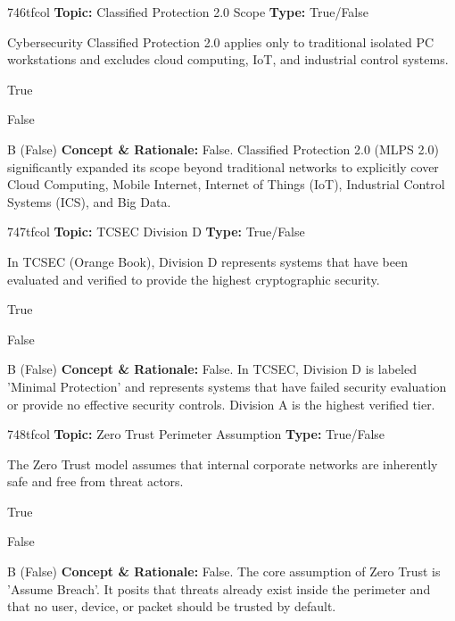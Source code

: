 \begin{qcard}{746}{tfcol}
\textcolor{darkslate!75}{\small\textbf{Topic:} Classified Protection 2.0 Scope \hfill \textbf{Type:} True/False}\vspace{0.4em}\par
Cybersecurity Classified Protection 2.0 applies only to traditional isolated PC workstations and excludes cloud computing, IoT, and industrial control systems.
\begin{qoptions}
\item True
\item False
\end{qoptions}
\end{qcard}
\nopagebreak
\begin{explainbox}{B (False)}
\textbf{Concept \& Rationale:} False. Classified Protection 2.0 (MLPS 2.0) significantly expanded its scope beyond traditional networks to explicitly cover Cloud Computing, Mobile Internet, Internet of Things (IoT), Industrial Control Systems (ICS), and Big Data.
\end{explainbox}

\begin{qcard}{747}{tfcol}
\textcolor{darkslate!75}{\small\textbf{Topic:} TCSEC Division D \hfill \textbf{Type:} True/False}\vspace{0.4em}\par
In TCSEC (Orange Book), Division D represents systems that have been evaluated and verified to provide the highest cryptographic security.
\begin{qoptions}
\item True
\item False
\end{qoptions}
\end{qcard}
\nopagebreak
\begin{explainbox}{B (False)}
\textbf{Concept \& Rationale:} False. In TCSEC, Division D is labeled 'Minimal Protection' and represents systems that have failed security evaluation or provide no effective security controls. Division A is the highest verified tier.
\end{explainbox}

\begin{qcard}{748}{tfcol}
\textcolor{darkslate!75}{\small\textbf{Topic:} Zero Trust Perimeter Assumption \hfill \textbf{Type:} True/False}\vspace{0.4em}\par
The Zero Trust model assumes that internal corporate networks are inherently safe and free from threat actors.
\begin{qoptions}
\item True
\item False
\end{qoptions}
\end{qcard}
\nopagebreak
\begin{explainbox}{B (False)}
\textbf{Concept \& Rationale:} False. The core assumption of Zero Trust is 'Assume Breach'. It posits that threats already exist inside the perimeter and that no user, device, or packet should be trusted by default.
\end{explainbox}

